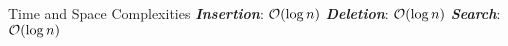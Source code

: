 \documentclass[aspectratio=169]{beamer}
\newcommand{\textib}[1]{\textit{\textbf{{#1}}}}
\begin{document}

\begin{frame}{Time and Space Complexities}
    \textib{Insertion}: ${\cal{O}} (\log n)$
    \hfil
    \newline
    \textib{Deletion}: ${\cal{O}} (\log n)$
    \hfil
    \newline
    \textib{Search}: ${\cal{O}} (\log n)$
\end{frame}
\end{document}
